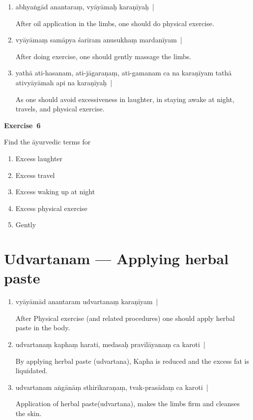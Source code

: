 \begin{enumerate}
\item {}

abhyaṅgād anantaraṃ,  vyāyāmaḥ karaṇīyaḥ~|

After oil application in the limbs, one should do physical exercise. 

\item {}

vyāyāmaṃ samāpya śarīram anusukhaṃ mardanīyam~|

After doing exercise, one should gently massage the limbs. 

\item {}

yathā ati-hasanam, ati-jāgaraṇaṃ, ati-gamanam ca na karaṇīyam tathā ativyāyāmah api na karaṇīyaḥ~|

As one should avoid excessiveness in laughter, in staying awake at night, travels, and physical exercise.
\end{enumerate}

\centerline{\textbf{Exercise~6}}

Find the āyurvedic terms for
\begin{enumerate}
\itemsep=0pt
\renewcommand{\theenumi}{\alph{enumi}}
\renewcommand{\labelenumi}{\theenumi.}
\item Excess laughter
\item Excess travel
\item Excess waking up at night
\item Excess physical exercise
\item Gently
\end{enumerate}

\chapter{Udvartanam --- Applying herbal paste}

\begin{enumerate}
\itemsep=0pt
\item {}

vyāyāmād anantaram udvartanaṃ karaṇīyam~|

After Physical exercise (and related procedures) one should apply herbal paste in the body.  

\item {}

udvartanaṃ kaphaṃ harati, medasaḥ pravilāyanaṃ ca karoti~|

By applying herbal paste (udvartana), Kapha is reduced and the excess fat is liquidated. 

\item {}

udvartanam aṅgānāṃ sthirīkaraṇaṃ, tvak-prasādaṃ ca karoti~| 

Application of herbal paste(udvartana), makes the limbs firm and cleanses the skin.
\end{enumerate}

